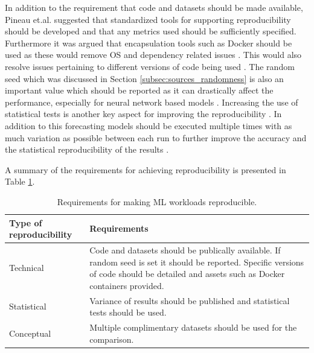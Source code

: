 In addition to the requirement that code and datasets should be made available, Pineau et.al. suggested that standardized tools for supporting reproducibility should be developed and that any metrics used should be sufficiently specified. Furthermore it was argued that encapsulation tools such as Docker should be used as these would remove OS and dependency related issues \cite{pineau2020improving}. This would also resolve issues pertaining to different versions of code being used \cite{beam2020challenges}. The random seed which was discussed in Section \ref{subsec:sources_randomness} is also an important value which should be reported as it can drastically affect the performance, especially for neural network based models \cite{beam2020challenges, bouthillier2021accounting}. Increasing the use of statistical tests is another key aspect for improving the reproducibility \cite{mcdermott2019reproducibility}. In addition to this forecasting models should be executed multiple times with as much variation as possible between each run to further improve the accuracy and the statistical reproducibility of the results
\cite{bouthillier2021accounting}.

A summary of the requirements for achieving reproducibility is presented in Table \ref{tab:reproducibility}.

\begin{table}[h]
  \centering
  \begin{tabularx}{\textwidth}{|l|X|}
    \hline
    Type of reproducibility & Requirements                                                                                                                                                                               \\
    \hline
    \hline
    Technical               & Code and datasets should be publically available. If random seed is set it should be reported. Specific versions of code should be detailed and assets such as Docker containers provided. \\
    \hline
    Statistical             & Variance of results should be published and statistical tests should be used.                                                                                                              \\
    \hline
    Conceptual              & Multiple complimentary datasets should be used for the comparison.                                                                                                                         \\
    \hline
  \end{tabularx}
  \caption{Requirements for making ML workloads reproducible.}
  \label{tab:reproducibility}
\end{table}


